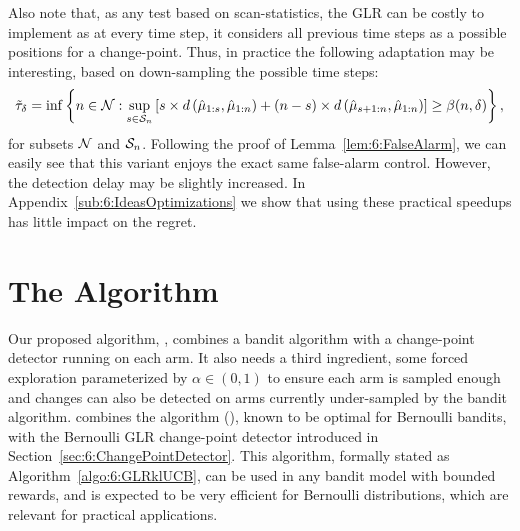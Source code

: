 Also note that, as any test based on scan-statistics, the GLR can be costly to implement as at every time step, it considers all previous time steps as a possible positions for a change-point. Thus, in practice the following adaptation may be interesting, based on down-sampling the possible time steps:
\begin{equation}\label{def:6:GLRTricks}
    \tilde \tau_{\delta} = \inf \left\{ n \in \mathcal{N} : \sup_{s \in \mathcal{S}_n} \left[s \times d\left(\hat{\mu}_{1:s},\hat{\mu}_{1:n}\right) + (n-s) \times d\left(\hat{\mu}_{s+1:n},\hat{\mu}_{1:n}\right)\right] \geq \beta(n,\delta)\right\},
\end{equation}
for subsets $\mathcal{N}$ and $\mathcal{S}_n$. Following the proof of Lemma~\ref{lem:6:FalseAlarm}, we can easily see that this variant enjoys the exact same false-alarm control.
However, the detection delay may be slightly increased. In Appendix~\ref{sub:6:IdeasOptimizations} we show that using these practical speedups has little impact on the regret.



\section{The \GLRklUCB{} Algorithm}
\label{sec:6:GLRklUCB_Algorithm}

Our proposed algorithm,  \GLRklUCB{},  combines a bandit algorithm with a change-point detector running on each arm.
It also needs a third ingredient, some forced exploration parameterized by $\alpha\in(0,1)$ to ensure each arm is sampled enough and changes can also be detected on arms currently under-sampled by the bandit algorithm.
%
\GLRklUCB{} combines the \klUCB{} algorithm (\cite{KLUCBJournal}), known to be optimal for Bernoulli bandits, with the Bernoulli GLR change-point detector introduced in Section~\ref{sec:6:ChangePointDetector}.
%
This algorithm, formally stated as Algorithm~\ref{algo:6:GLRklUCB}, can be used in any bandit model with bounded rewards, and is expected to be very efficient for Bernoulli distributions, which are relevant for practical applications.


